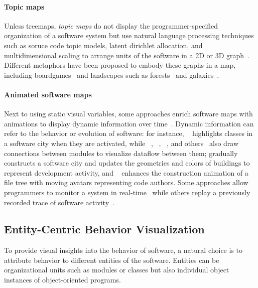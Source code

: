 \paragraph{Topic maps}

Unless treemaps, \emph{topic maps} do not display the programmer-specified organization of a software system but use natural language processing techniques such as soruce code topic models, latent dirichlet allocation, and multidimensional scaling to arrange units of the software in a 2D or 3D graph~\cite{atzberger2023visualization}.
Different metaphors have been proposed to embody these graphs in a map, including boardgames~\cite{atzberger2022visualization} and landscapes such as forests~\cite{atzberger2021softwareforest} and galaxies~\cite{atzberger2021softwaregalaxies}.

\paragraph{Animated software maps}

Next to using static visual variables, some approaches enrich software maps with animations to display dynamic information over time~\cite[sec. 3.4]{lemieux2006visualization}.
Dynamic information can refer to the behavior or evolution of software:
for instance, ~\cite{dugerdil2008execution} highlights classes in a software city when they are activated, while ~\cite{dashuber2022trace}, ~\cite{krause2021live}, ~\cite{waller2013synchrovis}, and others~\cite{ciolkowski20173d} also draw connections between modules to visualize dataflow between them;
\Cite{langelier2008exploring} gradually constructs a software city and updates the geometries and colors of buildings to represent development activity, and ~\cite{caudwell2010gource} enhances the construction animation of a file tree with moving avatars representing code authors.
Some approaches allow programmers to monitor a system in real-time~\cite{fittkau2013live} while others replay a previously recorded trace of software activity~\cite{dugerdil2008execution}.

\subsection{Entity-Centric Behavior Visualization}

To provide visual insights into the behavior of software, a natural choice is to attribute behavior to different entities of the software.
Entities can be organizational units such as modules or classes but also individual object instances of object-oriented programs.

